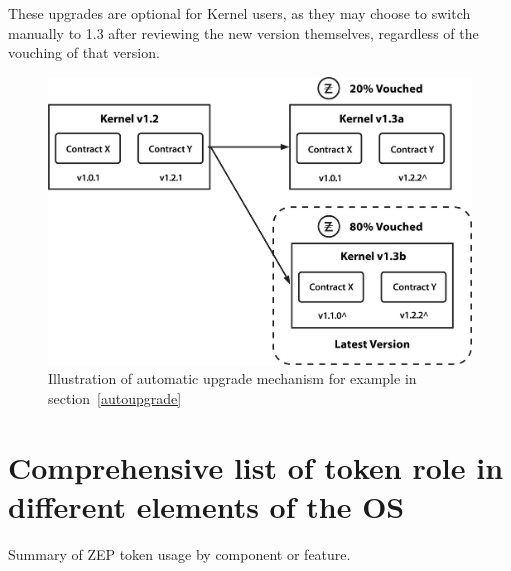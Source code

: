 \documentclass[]{article}
\makeatletter
\DeclareRobustCommand{\_}{%
  \leavevmode\vbox{%
    \hrule\@width.5em
          \@height-.26ex
          \@depth\dimexpr.26ex+.28pt\relax}}
\makeatother
\begin{document}
These upgrades are optional for Kernel users, as they may choose to
switch manually to 1.3 after reviewing the new version themselves,
regardless of the vouching of that version.

\begin{figure}
  \centering
  \includegraphics[width=0.75\linewidth]{images/image1.jpg}
  \caption{Illustration of automatic upgrade mechanism for example in section~\ref{autoupgrade}}
\end{figure}

\clearpage

\appendix

\section{Comprehensive list of token role in different
elements of the OS}

Summary of ZEP token usage by component or feature.
\end{document}
